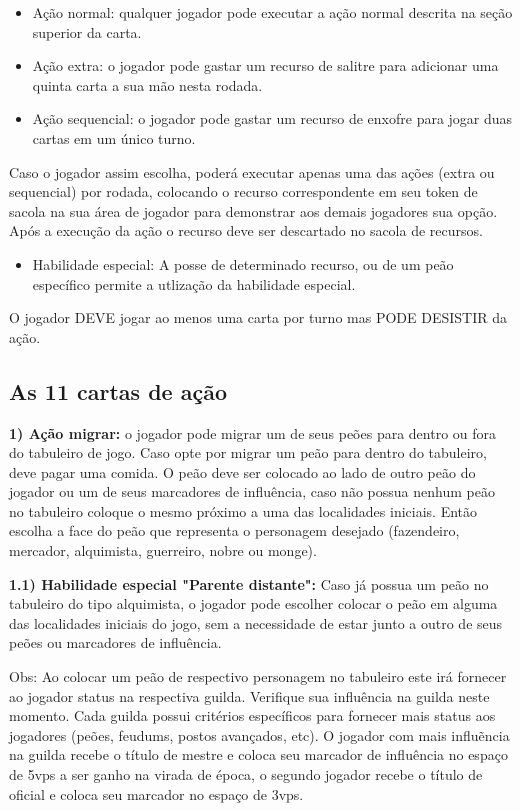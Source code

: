 \documentclass[11pt]{article}
\begin{document}
\begin{itemize}
\item Ação normal: qualquer jogador pode executar a ação normal descrita na seção superior da carta.
\item Ação extra: o jogador pode gastar um recurso de salitre para adicionar uma quinta carta a sua mão nesta rodada.
\item Ação sequencial: o jogador pode gastar um recurso de enxofre para jogar duas cartas em um único turno.
\end{itemize}

Caso o jogador assim escolha, poderá executar apenas uma das ações (extra ou sequencial) por rodada, colocando o recurso correspondente em seu token de sacola na sua área de jogador
para demonstrar aos demais jogadores sua opção.
Após a execução da ação o recurso deve ser descartado no sacola de recursos.

\begin{itemize}
\item Habilidade especial: A posse de determinado recurso, ou de um peão específico permite a utlização da habilidade especial.
\end{itemize}

O jogador DEVE jogar ao menos uma carta por turno mas PODE DESISTIR da ação.

\subsection{As 11 cartas de ação}
\label{sec:orgheadline6}


\textbf{1) Ação migrar:} o jogador pode migrar um de seus peões para dentro ou fora do tabuleiro de jogo. Caso opte por migrar um peão para dentro do tabuleiro, deve pagar uma comida.
O peão deve ser colocado ao lado de outro peão do jogador ou um de seus marcadores de influência, caso não possua nenhum peão no tabuleiro coloque o mesmo próximo a uma das localidades
iniciais. Então escolha a face do peão que representa o personagem desejado (fazendeiro, mercador, alquimista, guerreiro, nobre ou monge).

\textbf{1.1) Habilidade especial "Parente distante":} Caso já possua um peão no tabuleiro do tipo alquimista, o jogador pode escolher colocar o peão em alguma das localidades iniciais do jogo,
sem a necessidade de estar junto a outro de seus peões ou marcadores de influência.

Obs: Ao colocar um peão de respectivo personagem no tabuleiro este irá fornecer ao jogador status na respectiva guilda. Verifique sua influência na guilda neste momento. Cada guilda possui critérios
específicos para fornecer mais status aos jogadores (peões, feudums, postos avançados, etc). O jogador com mais influẽncia na guilda recebe o título de mestre e coloca seu marcador de influência
no espaço de 5vps a ser ganho na virada de época, o segundo jogador recebe o título de oficial e coloca seu marcador no espaço de 3vps.
\end{document}
